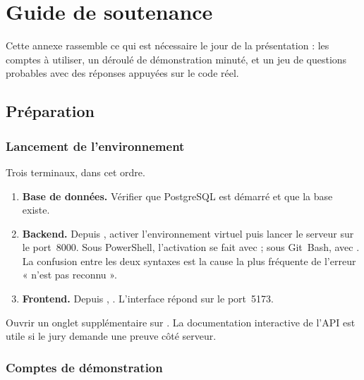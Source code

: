 \chapter{Guide de soutenance}
\label{ann:soutenance}

Cette annexe rassemble ce qui est nécessaire le jour de la présentation : les comptes à
utiliser, un déroulé de démonstration minuté, et un jeu de questions probables avec des
réponses appuyées sur le code réel.

\section{Préparation}

\subsection{Lancement de l'environnement}

Trois terminaux, dans cet ordre.

\begin{enumerate}
  \item \textbf{Base de données.} Vérifier que PostgreSQL est démarré et que la base
     existe.
  \item \textbf{Backend.} Depuis , activer l'environnement virtuel puis
    lancer le serveur sur le port~8000. Sous PowerShell, l'activation se fait avec
     ; sous
    Git~Bash, avec . La confusion entre les deux
    syntaxes est la cause la plus fréquente de l'erreur
    «  n'est pas reconnu ».
  \item \textbf{Frontend.} Depuis , . L'interface
    répond sur le port~5173.
\end{enumerate}

Ouvrir un onglet supplémentaire sur . La documentation
interactive de l'API est utile si le jury demande une preuve côté serveur.

\subsection{Comptes de démonstration}

